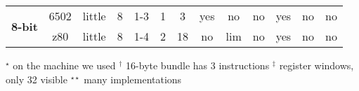 \begin{sidewaystable}[tbp]
\begin{sf}
\begin{footnotesize}
\begin{center}
\begin{tabular}{|c|c||c|c|c|c|c|c|c|c|c|c|c|}
\hline
\hline



\multirow{2}{*}{\bf 8-bit} &
6502             & %
little           & %
8                & %
1-3              & %
1                & %
3                & %
yes              & %
no               & %
no               & %
yes              & %
no               & %
no                 %
\\
\cline{2-13}


                 & %
z80              & %
little           & %
8                & %
1-4              & %
2                & %
18               & %
no               & %
lim              & %
no 		 & %
yes              & %
no               & %
no                 %
\\
\cline{2-13}

\hline

\end{tabular}

$^{\star}$ on the machine we used \hspace{2em}$^{\dagger}$ 16-byte bundle has 3 instructions
\hspace{3em}$^{\ddagger}$ register windows, only 32 visible
\hspace{2em}$^{\star\star}$ many implementations
\end{center}
\end{footnotesize}
\end{sf}
\end{sidewaystable}
